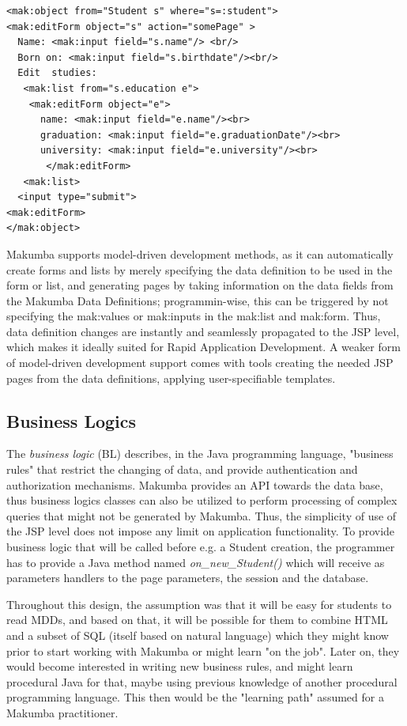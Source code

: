 \documentclass{llncs}
\begin{document}
\lstset{basicstyle=\small, captionpos=b, caption=Example of changing data with the Makumba JSP tag library, label=form:mak, frame=shadowbox}
\begin{lstlisting}
<mak:object from="Student s" where="s=:student">
<mak:editForm object="s" action="somePage" >
  Name: <mak:input field="s.name"/> <br/>
  Born on: <mak:input field="s.birthdate"/><br/>
  Edit  studies:
   <mak:list from="s.education e"> 
   	<mak:editForm object="e">
   	  name: <mak:input field="e.name"/><br>      
	  graduation: <mak:input field="e.graduationDate"/><br>      
	  university: <mak:input field="e.university"/><br>
       </mak:editForm>
   <mak:list>
  <input type="submit">
<mak:editForm>
</mak:object>
\end{lstlisting}

Makumba supports model-driven development methods, as it can automatically create forms and lists by merely specifying the data definition to be used in the form or list, and generating pages by taking information on the data fields from the Makumba Data Definitions; programmin-wise, this can be triggered by not specifying the mak:values or mak:inputs in the mak:list and mak:form. Thus, data definition changes are instantly and seamlessly propagated to the JSP level, which makes it ideally suited for Rapid Application Development. A weaker form of model-driven development support comes with tools creating the needed JSP pages from the data definitions, applying user-specifiable templates.


\subsection{Business Logics}
The \textit{business logic} (BL) describes, in the Java programming language, "business rules" that restrict the changing of data, and provide authentication and authorization mechanisms. Makumba provides an API towards the data base, thus business logics classes can also be utilized to perform processing of complex queries that might not be generated by Makumba. Thus, the simplicity of use of the JSP level does not impose any limit on application functionality. To provide business logic that will be called before e.g. a Student creation, the programmer has to provide a Java method named \textit{on\_new\_Student()} which will receive as parameters handlers to the page parameters, the session and the database.

Throughout this design, the assumption was that it will be easy for students to read MDDs, and based on that, it will be possible for them to combine HTML and a subset of SQL (itself based on natural language) which they might know prior to start working with Makumba or might learn "on the job". Later on, they would become interested in writing new business rules, and might learn procedural Java for that, maybe using previous knowledge of another procedural programming language. This then would be the "learning path" assumed for a Makumba practitioner.
\end{document}
